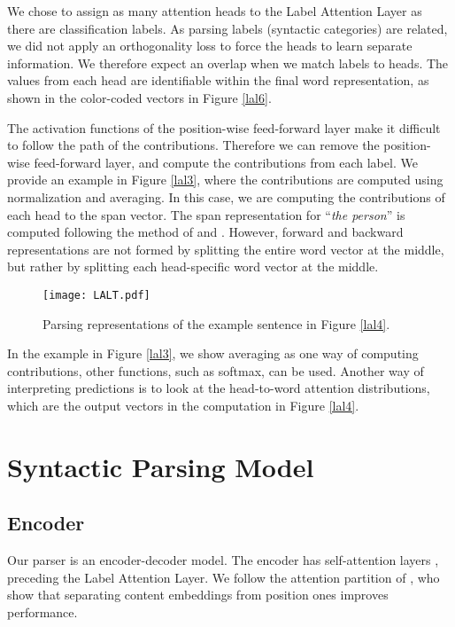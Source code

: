 \documentclass[11pt,a4paper]{article}
\begin{document}
We chose to assign as many attention heads to the Label Attention Layer as there are classification labels. As parsing labels (syntactic categories) are related, we did not apply an orthogonality loss to force the heads to learn separate information. We therefore expect an overlap when we match labels to heads. The values from each head are identifiable within the final word representation, as shown in the color-coded vectors in Figure \ref{lal6}.

The activation functions of the position-wise feed-forward layer make it difficult to follow the path of the contributions. Therefore we can remove the position-wise feed-forward layer, and compute the contributions from each label. We provide an example in Figure \ref{lal3}, where the contributions are computed using normalization and averaging. In this case, we are computing the contributions of each head to the span vector. The span representation for ``\textit{the person}'' is computed following the method of \citet{gaddy2018s} and \citet{kitaev2018constituency}. However, forward and backward representations are not formed by splitting the entire word vector at the middle, but rather by splitting each head-specific word vector at the middle.

\begin{figure}
    \centering
    \texttt{[image: LALT.pdf]}
    \caption{Parsing representations of the example sentence in Figure \ref{lal4}.}
    \label{lal_trees}
\end{figure}

In the example in Figure \ref{lal3}, we show averaging as one way of computing contributions, other functions, such as softmax, can be used. Another way of interpreting predictions is to look at the head-to-word attention distributions, which are the output vectors in the computation in Figure \ref{lal4}.

\section{Syntactic Parsing Model}
\label{section_parser}

\subsection{Encoder}
Our parser is an encoder-decoder model. The encoder has self-attention layers \cite{vaswani2017attention}, preceding the Label Attention Layer. We follow the attention partition of \citet{kitaev2018constituency}, who show that separating content embeddings from position ones improves performance.
\end{document}
